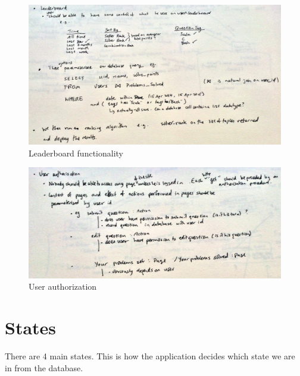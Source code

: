 \documentclass{report}
\begin{document}
\begin{figure}[H]
\includegraphics[width=\textwidth]{leaderboard}
\caption{Leaderboard functionality}
\end{figure}

\begin{figure}[H]
\includegraphics[width=\textwidth]{authorization}
\caption{User authorization}
\end{figure}

\section{States}
There are 4 main states. This is how the application decides which state we are in from the database.
\end{document}
